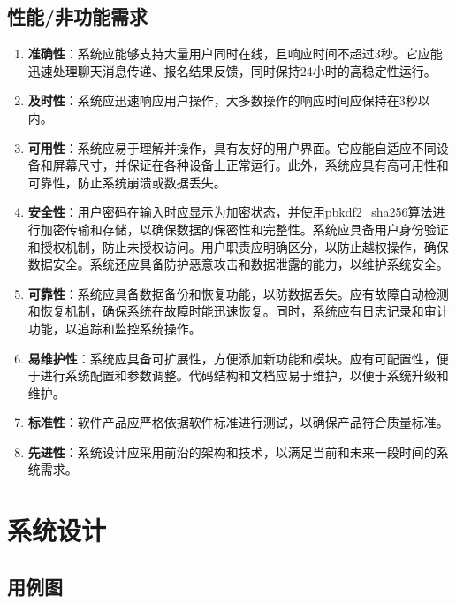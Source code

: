 \documentclass[UTF8,a4paper,10pt]{ctexart}
\begin{document}
\subsection{性能/非功能需求}

\begin{enumerate}
    \item \textbf{准确性}：系统应能够支持大量用户同时在线，且响应时间不超过3秒。它应能迅速处理聊天消息传递、报名结果反馈，同时保持24小时的高稳定性运行。
    
    \item \textbf{及时性}：系统应迅速响应用户操作，大多数操作的响应时间应保持在3秒以内。
    
    \item \textbf{可用性}：系统应易于理解并操作，具有友好的用户界面。它应能自适应不同设备和屏幕尺寸，并保证在各种设备上正常运行。此外，系统应具有高可用性和可靠性，防止系统崩溃或数据丢失。
    
    \item \textbf{安全性}：用户密码在输入时应显示为加密状态，并使用pbkdf2\_sha256算法进行加密传输和存储，以确保数据的保密性和完整性。系统应具备用户身份验证和授权机制，防止未授权访问。用户职责应明确区分，以防止越权操作，确保数据安全。系统还应具备防护恶意攻击和数据泄露的能力，以维护系统安全。
    
    \item \textbf{可靠性}：系统应具备数据备份和恢复功能，以防数据丢失。应有故障自动检测和恢复机制，确保系统在故障时能迅速恢复。同时，系统应有日志记录和审计功能，以追踪和监控系统操作。
    
    \item \textbf{易维护性}：系统应具备可扩展性，方便添加新功能和模块。应有可配置性，便于进行系统配置和参数调整。代码结构和文档应易于维护，以便于系统升级和维护。
    
    \item \textbf{标准性}：软件产品应严格依据软件标准进行测试，以确保产品符合质量标准。
    
    \item \textbf{先进性}：系统设计应采用前沿的架构和技术，以满足当前和未来一段时间的系统需求。
\end{enumerate}

\section{系统设计}

\subsection{用例图}
\end{document}
